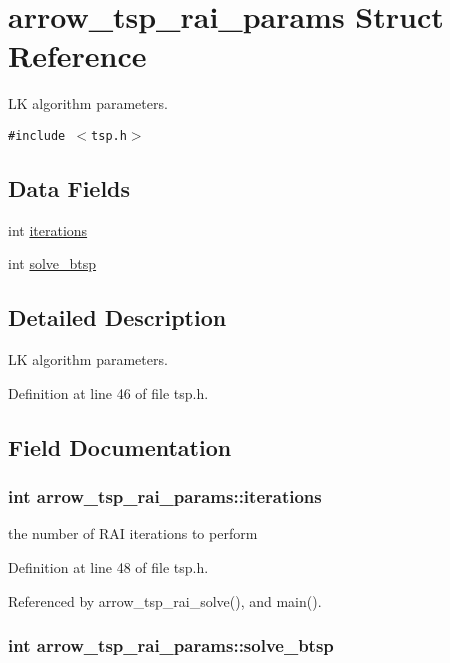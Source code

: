 \hypertarget{structarrow__tsp__rai__params}{
\section{arrow\_\-tsp\_\-rai\_\-params Struct Reference}
\label{structarrow__tsp__rai__params}
}
LK algorithm parameters.  


{\tt \#include $<$tsp.h$>$}

\subsection*{Data Fields}
\begin{CompactItemize}
\item 
int \hyperlink{structarrow__tsp__rai__params_14326a50f514b040d8ec09d4cbbc2b5e}{iterations}
\item 
int \hyperlink{structarrow__tsp__rai__params_6602b034ac2eb2373184a028f0efc695}{solve\_\-btsp}
\end{CompactItemize}


\subsection{Detailed Description}
LK algorithm parameters. 

Definition at line 46 of file tsp.h.

\subsection{Field Documentation}
\hypertarget{structarrow__tsp__rai__params_14326a50f514b040d8ec09d4cbbc2b5e}{
\subsubsection{\setlength{\rightskip}{0pt plus 5cm}int {\bf arrow\_\-tsp\_\-rai\_\-params::iterations}}}
\label{structarrow__tsp__rai__params_14326a50f514b040d8ec09d4cbbc2b5e}


the number of RAI iterations to perform 

Definition at line 48 of file tsp.h.

Referenced by arrow\_\-tsp\_\-rai\_\-solve(), and main().\hypertarget{structarrow__tsp__rai__params_6602b034ac2eb2373184a028f0efc695}{
\subsubsection{\setlength{\rightskip}{0pt plus 5cm}int {\bf arrow\_\-tsp\_\-rai\_\-params::solve\_\-btsp}}}
\label{structarrow__tsp__rai__params_6602b034ac2eb2373184a028f0efc695}


